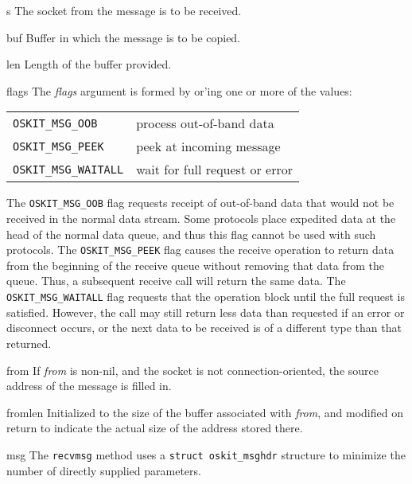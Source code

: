\begin{apiparm}
        \item[s]
                The socket from the message is to be received.

	\item[buf] Buffer in which the message is to be copied.

	\item[len] Length of the buffer provided.

	\item[flags]
		The \emph{flags} argument is formed by or'ing one or more 
		of the values:

		\begin{tabular}{ll}
		\texttt{OSKIT_MSG_OOB} 	 & process out-of-band data
		    \\
		\texttt{OSKIT_MSG_PEEK} 	 & peek at incoming message
		    \\
		\texttt{OSKIT_MSG_WAITALL}& wait for full request or error
		    \\
		\end{tabular}

		The \texttt{OSKIT_MSG_OOB} flag requests receipt of 
		out-of-band data that would not be received in the normal 
		data stream.
		Some protocols place expedited data
		at the head of the normal data queue, and thus this flag cannot
		be used with such protocols.
		The \texttt{OSKIT_MSG_PEEK} flag causes the receive 
		operation to return data from the beginning of the receive
		queue without removing that data from the queue.
		Thus, a subsequent receive call will return the same data.
		The \texttt{OSKIT_MSG_WAITALL} flag requests that the operation
		block until the full request is satisfied. 
		However, the call may still return less data than requested if
		an error or disconnect occurs, or the next data to be received 
		is of a different type than that returned.

        \item[from]
		If \emph{from} is non-nil, and the socket is not 
		connection-oriented, the source address of the message is
		filled in.  
	\item[fromlen]
		Initialized to the size of the buffer associated with 
		\emph{from}, and modified on return to indicate the actual 
		size of the address stored there.
	
	\item[msg] The \texttt{recvmsg} method uses a 
		\texttt{struct oskit_msghdr} structure to minimize the number
		of directly supplied parameters. 


\end{apiparm}
